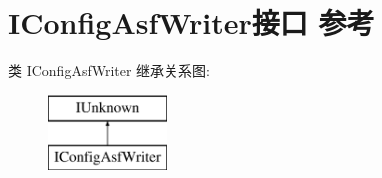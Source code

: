 \hypertarget{interface_i_config_asf_writer}{}\section{I\+Config\+Asf\+Writer接口 参考}
\label{interface_i_config_asf_writer}
类 I\+Config\+Asf\+Writer 继承关系图\+:\begin{figure}[H]
\begin{center}
\leavevmode
\includegraphics[height=2.000000cm]{interface_i_config_asf_writer}
\end{center}
\end{figure}
